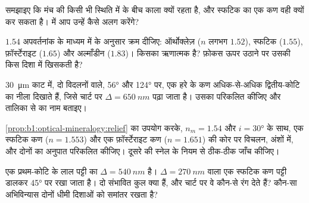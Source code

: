 \begin{exercise}[$\star$]\label{exo:b1:optical-mineralogy:3}
समझाइए कि  मंच की किसी भी स्थिति में  के बीच काला क्यों रहता है, और स्फटिक का एक कण वही क्यों कर
सकता है।  में आप उन्हें कैसे अलग करेंगे?
\end{exercise}

\begin{exercise}[$\star$]\label{exo:b1:optical-mineralogy:4}
$1.54$ अपवर्तनांक के माध्यम में  के अनुसार क्रम दीजिए: ऑर्थोक्लेज़ ($n$ लगभग $1.52$), स्फटिक ($1.55$), फ़ॉर्स्टेराइट
($1.65$) और अल्माँडीन ($1.83$)। किसका  ऋणात्मक है? फ़ोकस ऊपर उठाने पर उसकी  किस दिशा में खिसकती है?
\end{exercise}

\begin{exercise}[$\star\star$]\label{exo:b1:optical-mineralogy:5}
\qty{30}{\micro m} काट में, दो विदलनों वाले, \ang{56} और \ang{124} पर, एक हरे   के कण अधिक-से-अधिक द्वितीय-कोटि का
नीला दिखाते हैं, जिसे चार्ट पर $\Delta = \qty{650}{nm}$ पढ़ा जाता है। उसका  परिकलित कीजिए और तालिका से  का नाम
बताइए।
\end{exercise}

\begin{exercise}[$\star\star$]\label{exo:b1:optical-mineralogy:6}
\cref{prop:b1:optical-mineralogy:relief} का उपयोग करके, $n_m = 1.54$ और $i = \ang{30}$ के साथ, एक स्फटिक कण ($n = 1.553$)
और एक फ़ॉर्स्टेराइट कण ($n = 1.651$) की कोर पर विचलन, अंशों में, और दोनों का अनुपात परिकलित कीजिए। दूसरे की स्नेल के
नियम से ठीक-ठीक जाँच कीजिए।
\end{exercise}

\begin{exercise}[$\star\star$]\label{exo:b1:optical-mineralogy:7}
एक प्रथम-कोटि के लाल पट्टी का $\Delta = \qty{540}{nm}$ है। $\Delta = \qty{270}{nm}$ वाला एक स्फटिक कण पट्टी डालकर \ang{45} पर
रखा जाता है। दो संभावित कुल  क्या हैं, और चार्ट पर वे कौन-से रंग देते हैं? कौन-सा अभिविन्यास दोनों धीमी दिशाओं को
समांतर रखता है?
\end{exercise}

